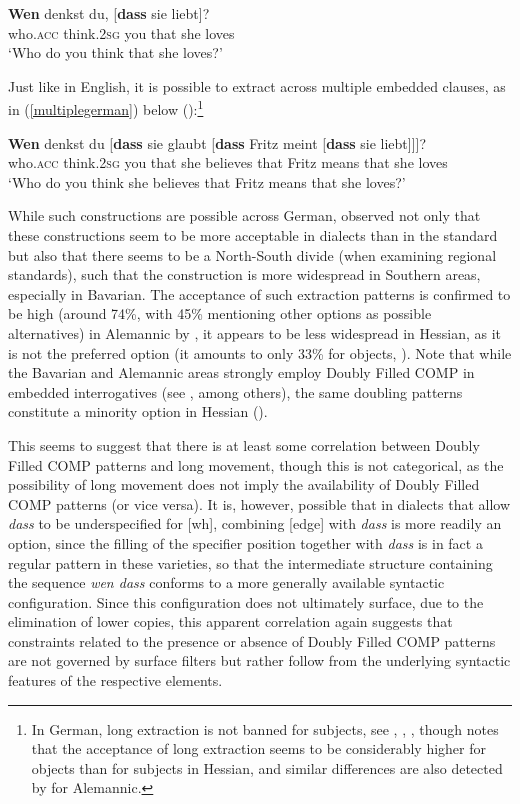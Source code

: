 \ea \gll \textbf{Wen} denkst du, [\textbf{dass} sie liebt]? \label{germanlong}\\
who.\textsc{acc} think.\textsc{2sg} you \phantom{[}that she loves\\
\glt `Who do you think that she loves?'
\z

Just like in English, it is possible to extract across multiple embedded clauses, as in (\ref{multiplegerman}) below (\citealt[25]{fanselow2017}):\footnote{In German, long extraction is not banned for subjects, see \citet{fanselow2017}, \citet{brandnerbucheliberger2018}, \citet{weiss2016}, though \citet{weiss2016} notes that the acceptance of long extraction seems to be considerably higher for objects than for subjects in Hessian, and similar differences are also detected by \citet[36]{brandnerbucheliberger2018} for Alemannic.}

\ea \gll \textbf{Wen} denkst du [\textbf{dass} sie glaubt [\textbf{dass} Fritz meint [\textbf{dass} sie liebt]]]? \label{multiplegerman}\\
who.\textsc{acc} think.\textsc{2sg} you \phantom{[}that she believes \phantom{[}that Fritz means that she loves\\
\glt `Who do you think she believes that Fritz means that she loves?'
\z

While such constructions are possible across German, \citet{fanselowweskott2010} observed not only that these constructions seem to be more acceptable in dialects than in the standard but also that there seems to be a North-South divide (when examining regional standards), such that the construction is more widespread in Southern areas, especially in Bavarian. The acceptance of such extraction patterns is confirmed to be high (around 74\%, with 45\% mentioning other options as possible alternatives) in Alemannic by \citet[34]{brandnerbucheliberger2018}, it appears to be less widespread in Hessian, as it is not the preferred option (it amounts to only 33\% for objects, \citealt{weiss2016}). Note that while the Bavarian and Alemannic areas strongly employ Doubly Filled COMP in embedded interrogatives (see \citealt{bayerbrandner2008}, among others), the same doubling patterns constitute a minority option in Hessian (\citealt{weiss2016doubly}).

This seems to suggest that there is at least some correlation between Doubly Filled COMP patterns and long movement, though this is not categorical, as the possibility of long movement does not imply the availability of Doubly Filled COMP patterns (or vice versa). It is, however, possible that in dialects that allow \textit{dass} to be underspecified for [wh], combining [edge] with \textit{dass} is more readily an option, since the filling of the specifier position together with \textit{dass} is in fact a regular pattern in these varieties, so that the intermediate structure containing the sequence \textit{wen dass} conforms to a more generally available syntactic configuration. Since this configuration does not ultimately surface, due to the elimination of lower copies, this apparent correlation again suggests that constraints related to the presence or absence of Doubly Filled COMP patterns are not governed by surface filters but rather follow from the underlying syntactic features of the respective elements.

